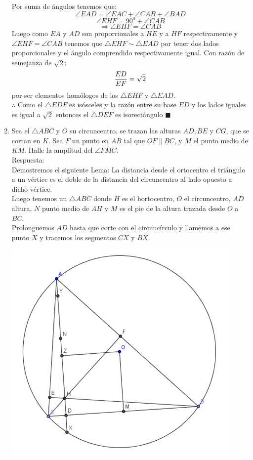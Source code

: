 \documentclass{book}
\begin{document}
\begin{enumerate}
          Por suma de ángulos tenemos que:
          $$\angle EAD=\angle EAC+\angle CAB+\angle BAD$$
          $$\angle EHF=90^0+\angle CAB$$
          $$\Rightarrow\angle EHF=\angle CAB$$
          Luego como $EA$ y $AD$ son proporcionales a $HE$ y a $HF$ respectivamente y $\angle EHF=\angle CAB$ tenemos que $\triangle EHF\sim\triangle EAD$ por tener dos lados proporcionales y el ángulo comprendido respectivamente igual. Con razón de semejanza de $\sqrt{2}$:
          $${ED\over EF}=\sqrt{2}$$
          por ser elementos homólogos de los $\triangle EHF$ y $\triangle EAD$.\\
          $\therefore$ Como el $\triangle EDF$ es isósceles y la razón entre su base $ED$ y los lados iguales es igual a $\sqrt{2}$ entonces el $\triangle DEF$ es isorectángulo $\blacksquare$\\
    \item Sea el $\triangle ABC$  y $O$ su circuncentro, se trazan las alturas $AD, BE$ y $CG$, que se cortan en $K$. Sea $F$ un punto en $AB$ tal que $OF \| BC$, y $M$ el punto medio de $KM$. Halle la amplitud del $\angle FMC$.\\
          Respuesta:\\
          Demostremos el siguiente Lema:
          La distancia desde el ortocentro el triángulo a un vértice es el doble de la distancia del circuncentro al lado opuesto a dicho vértice.\\
          Luego tenemos un $\triangle ABC$ donde $H$ es el hortocentro, $O$ el circuncentro, $AD$ altura, $N$ punto medio de $AH$ y $M$ es el pie de la altura trazada desde $O$ a $BC$.\\
          Prolonguemos $AD$ hasta que corte con el circuncírculo y llamemos a ese punto $X$ y tracemos los segmentos $CX$ y $BX$.
          \begin{center}
              \includegraphics[scale=1]{imagenes/Geometria/21,1.png}

\end{center}
\end{enumerate}
\end{document}
